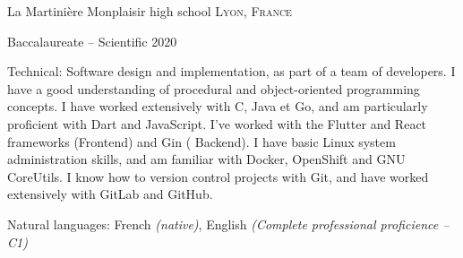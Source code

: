 \documentclass[10pt,a4paper]{article} %
\begin{document}

    \headedsection %
    {La Martinière Monplaisir high school}
    {\textsc{Lyon, France}} {

        \headedsubsection %
        {Baccalaureate -- Scientific}
        {2020} {}
    }

    \spacedhrule{0.5em}{-0.4em} %



    \inlineheadsection %
    {Technical:}
    {Software design and implementation,
        as part of a team of developers. I have a good understanding of
    procedural and object-oriented programming
        concepts. I have worked extensively with C, Java et Go,
        and am particularly proficient with Dart and JavaScript. I've worked with the Flutter and React frameworks (Frontend) and Gin (
        Backend). I have basic Linux system administration skills, and am familiar with Docker,
        OpenShift and GNU CoreUtils. I know how to version control projects with Git,
        and have worked extensively with GitLab and GitHub.}



    \inlineheadsection %
    {Natural languages:}
    {French \textit{(native)}, English \textit{(Complete professional proficience -- C1)}}
\end{document}
